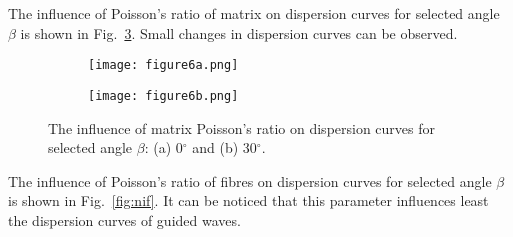 \documentclass[preprint,12pt]{elsarticle}
\providecommand{\DIFaddbeginFL}{} %
\providecommand{\DIFaddendFL}{} %
\providecommand{\DIFdelbeginFL}{} %
\providecommand{\DIFdelendFL}{} %
\begin{document}
The influence of  Poisson's ratio of matrix on dispersion curves for selected angle $\beta$ is shown in Fig.~\ref{fig:nim}. Small changes in dispersion curves can be observed.

\begin{figure} [h!]
	\centering
	\begin{subfigure}[b]{0.49\textwidth}
		\centering
		\DIFdelbeginFL %
\DIFdelendFL \DIFaddbeginFL \texttt{[image: figure6a.png]}
		\DIFaddendFL \caption{}
		\label{fig:nim0}
	\end{subfigure}
	\hfill
	\begin{subfigure}[b]{0.49\textwidth}
		\centering
		\texttt{[image: figure6b.png]}
		\caption{}
		\label{fig:nim30}
	\end{subfigure}
	\caption{The influence of matrix Poisson's ratio on dispersion curves for selected angle $\beta$: (a) 0$^{\circ}$ and (b) 30$^{\circ}$.}
	\label{fig:nim}
\end{figure}

The influence of Poisson's ratio of fibres  on dispersion curves for selected angle $\beta$ is shown in Fig.~\ref{fig:nif}. It can be noticed that this parameter influences least the dispersion curves of guided waves.
\end{document}
